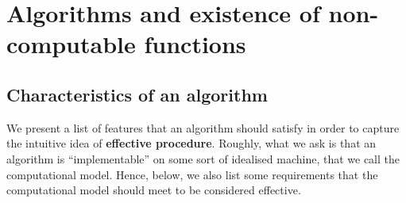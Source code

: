 \chapter{Algorithms and existence of non-computable functions}

\section{Characteristics of an algorithm}
\label{se:alg-char}

We present a list of features that an algorithm should satisfy in
order to capture the intuitive idea of \textbf{effective procedure}. Roughly,
what we ask is that an algorithm is ``implementable'' on some sort of
idealised machine, that we call the computational model. Hence, below, we 
also list some requirements that the computational model should meet to be
considered effective.

